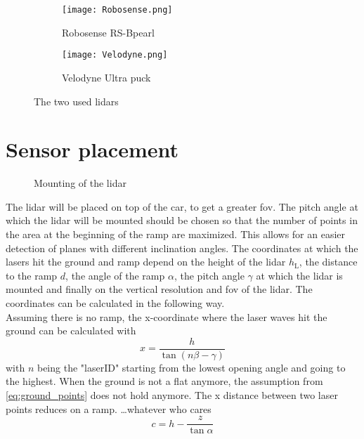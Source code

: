 \begin{figure}[htb]
	\centering
	\begin{subfigure}{0.3\textwidth}
		\centering
		\texttt{[image: Robosense.png]}
		\caption{Robosense RS-Bpearl \cite{RoboSense2020}}
		\label{fig:lidar_robosense}
	\end{subfigure}
	\begin{subfigure}{0.3\textwidth}
		\centering
		\texttt{[image: Velodyne.png]}
		\caption{Velodyne Ultra puck \cite{Velodyne2018}}
		\label{fig:lidar_velodyne}
	\end{subfigure}
	\caption{The two used \gls{lidar}s}
	\label{fig:lidars_used}
\end{figure}



\section{Sensor placement}
\begin{figure}[htpb]
	\centering
	
	\caption{Mounting of the \acrshort{lidar}}
	\label{fig:tikz_lidar_mount}
\end{figure}
The \gls{lidar} will be placed on top of the car, to get a greater \gls{fov}.
The pitch angle at which the \gls{lidar} will be mounted should be chosen so that the number of points in the area at the beginning of the ramp are maximized.
This allows for an easier detection of planes with different inclination angles.
The coordinates at which the lasers hit the ground and ramp depend on the height of the \gls{lidar} $ h_\mathrm{L} $, the distance to the ramp $d$, the angle of the ramp $\alpha$, the pitch angle $\gamma$ at which the \gls{lidar} is mounted and finally on the vertical resolution and \gls{fov} of the \gls{lidar}. The coordinates can be calculated in the following way.\\
Assuming there is no ramp, the x-coordinate where the laser waves hit the ground can be calculated with
\begin{equation}
	x = \frac{h}{\tan(n\beta - \gamma)}
	\label{eq:ground_points}
\end{equation}
with $n$ being the "laserID" starting from the lowest opening angle and going to the highest.
When the ground is not a flat anymore, the assumption from \ref{eq:ground_points} does not hold anymore. The x distance between two laser points reduces on a ramp.
\dots whatever who cares
\[ c = h - \frac{z}{\tan \alpha} \]



